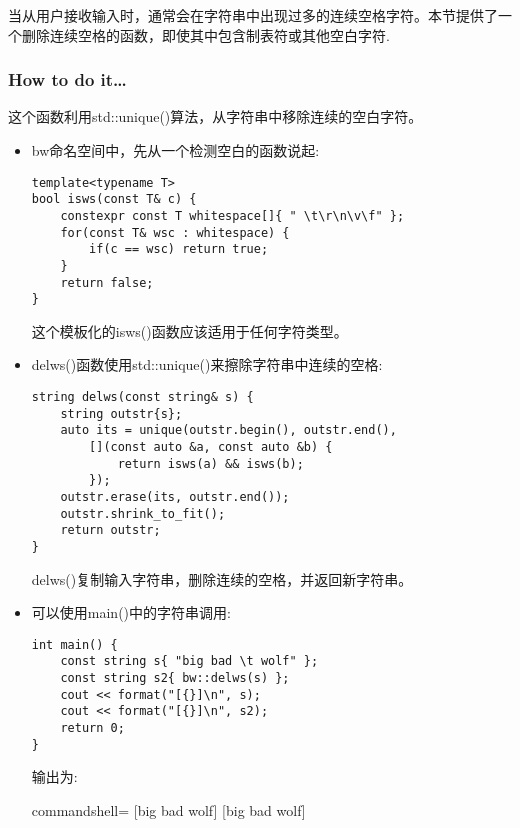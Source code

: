 

当从用户接收输入时，通常会在字符串中出现过多的连续空格字符。本节提供了一个删除连续空格的函数，即使其中包含制表符或其他空白字符.

\subsubsection{How to do it…}

这个函数利用std::unique()算法，从字符串中移除连续的空白字符。

\begin{itemize}
\item 
bw命名空间中，先从一个检测空白的函数说起:

\begin{lstlisting}[style=styleCXX]
template<typename T>
bool isws(const T& c) {
	constexpr const T whitespace[]{ " \t\r\n\v\f" };
	for(const T& wsc : whitespace) {
		if(c == wsc) return true;
	}
	return false;
}
\end{lstlisting}

这个模板化的isws()函数应该适用于任何字符类型。

\item 
delws()函数使用std::unique()来擦除字符串中连续的空格:

\begin{lstlisting}[style=styleCXX]
string delws(const string& s) {
	string outstr{s};
	auto its = unique(outstr.begin(), outstr.end(),
		[](const auto &a, const auto &b) {
			return isws(a) && isws(b);
		});
	outstr.erase(its, outstr.end());
	outstr.shrink_to_fit();
	return outstr;
}
\end{lstlisting}

delws()复制输入字符串，删除连续的空格，并返回新字符串。

\item 
可以使用main()中的字符串调用:

\begin{lstlisting}[style=styleCXX]
int main() {
	const string s{ "big bad \t wolf" };
	const string s2{ bw::delws(s) };
	cout << format("[{}]\n", s);
	cout << format("[{}]\n", s2);
	return 0;
}
\end{lstlisting}

输出为:

\begin{tcblisting}{commandshell={}}
[big     bad                  wolf]
[big bad wolf]
\end{tcblisting}

\end{itemize}

